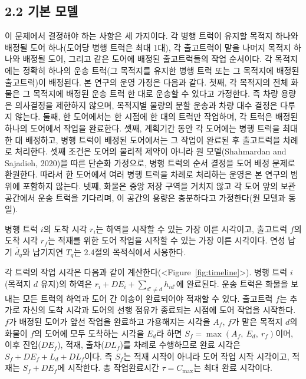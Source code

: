 \documentclass[10pt,a4paper]{article}
\begin{document}
\subsection{2.2 기본 모델}
이 문제에서 결정해야 하는 사항은 세 가지이다. 각 병행 트럭이 유지할 목적지 하나와 배정될 도어 하나(도어당 병행 트럭은
최대 1대), 각 출고트럭이 맡을 나머지 목적지 하나와 배정될 도어, 그리고 같은 도어에 배정된 출고트럭들의
작업 순서이다. 각 목적지에는 정확히 하나의 운송 트럭(그 목적지를 유지한 병행 트럭 또는 그 목적지에 배정된 출고트럭)이 배정된다.
본 연구의 운영 가정은 다음과 같다. 첫째, 각 목적지의 전체 화물은 그 목적지에 배정된 운송 트럭 한 대로
운송할 수 있다고 가정한다. 즉 차량 용량은 의사결정을 제한하지 않으며, 목적지별 물량의 분할 운송과
차량 대수 결정은 다루지 않는다. 둘째, 한 도어에서는 한 시점에 한 대의 트럭만 작업하며, 각 트럭은 배정된
하나의 도어에서 작업을 완료한다. 셋째, 계획기간 동안 각 도어에는 병행 트럭을 최대 한 대 배정하고, 병행
트럭이 배정된 도어에서는 그 작업이 완료된 후 출고트럭을 차례로 처리한다. 셋째 조건은 도어의 물리적 제약이
아니라 원 모델(Shahmardan and Sajadieh, 2020)을 따른 단순화 가정으로, 병행 트럭의 순서 결정을 도어 배정 문제로 환원한다. 따라서 한 도어에서 여러 병행 트럭을 차례로 처리하는 운영은 본 연구의 범위에 포함하지 않는다.
넷째, 화물은 중앙 저장 구역을 거치지 않고 각 도어 앞의 보관 공간에서 운송 트럭을 기다리며, 이 공간의
용량은 충분하다고 가정한다(원 모델과 동일).

병행 트럭 $i$의 도착 시각 $r_i$는 하역을 시작할 수 있는 가장 이른 시각이고,
출고트럭 $f$의 도착 시각 $r_f$는 적재를 위한 도어 작업을 시작할 수 있는 가장 이른 시각이다.
연성 납기 $\bar d_q$와 납기지연 $T_q$는 2.4절의 목적식에서 사용한다.

각 트럭의 작업 시각은 다음과 같이 계산한다(<Figure~\ref{fig:timeline}>). 병행 트럭 $i$(목적지 $d$ 유지)의 하역은
$r_i+DE_i+\sum_{d'\ne d}h_{id'}$에 완료된다. 운송 트럭은 화물을 보내는 모든 트럭의 하역과
도어 간 이송이 완료되어야 적재할 수 있다. 출고트럭 $f$는 추가로 자신의 도착 시각과 도어의 선행 점유가 종료되는 시점에 도어 작업을 시작한다.
$f$가 배정된 도어가 앞선 작업을 완료하고 가용해지는 시각을 $A_f$, $f$가 맡은 목적지 $d$의 화물이 $f$의 도어에 모두 도착하는 시각을 $E_d$라 하면
$S_f=\max(A_f,\ E_d,\ r_f)$이며, 이후
진입($DE_f$), 적재, 출차($DL_f$)를 차례로 수행하므로 완료 시각은
$S_f+DE_f+L_d+DL_f$이다. 즉 $S_f$는 적재 시작이 아니라 도어 작업 시작 시각이고,
적재는 $S_f+DE_f$에 시작한다. 총 작업완료시간 $\tau=C_{\max}$는 최대 완료 시각이다.
\end{document}
